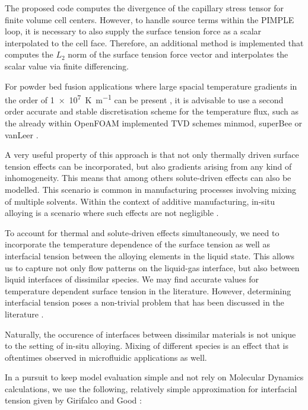 \documentclass[conference,final]{IEEEtran}
\begin{document}
The proposed code computes the divergence of the capillary stress tensor for finite volume cell centers. However, to handle source terms within the PIMPLE loop, it is necessary to also supply the surface tension force as a scalar interpolated to the cell face. Therefore, an additional method is implemented that computes the $L_2$ norm of the surface tension force vector and interpolates the scalar value via finite differencing.

For powder bed fusion applications where large spacial temperature gradients in the order of \SI[per-mode=fraction]{1e7}{\kelvin \per \metre} can be present \cite{hooperMeltPoolTemperature2018}, it is advisable to use a second order accurate and stable discretisation scheme for the temperature flux, such as the already within OpenFOAM implemented TVD schemes minmod, superBee or vanLeer \cite{roeCharacteristicBasedSchemesEuler1986,vanleerUltimateConservativeDifference1974}.

A very useful property of this approach is that not only thermally driven surface tension effects can be incorporated, but also gradients arising from any kind of inhomogeneity. This means that among others solute-driven effects can also be modelled. This scenario is common in manufacturing processes involving mixing of multiple solvents. Within the context of additive manufacturing, in-situ alloying is a scenario where such effects are not negligible \cite{katz-demyanetzInsituAlloyingNovel2020}.

To account for thermal and solute-driven effects simultaneously, we need to incorporate the temperature dependence of the surface tension as well as interfacial tension between the alloying elements in the liquid state. This allows us to capture not only flow patterns on the liquid-gas interface, but also between liquid interfaces of dissimilar species. We may find accurate values for temperature dependent surface tension in the literature. However, determining interfacial tension poses a non-trivial problem that has been discussed in the literature \cite{marmurCorrelatingInterfacialTensions2010}.

Naturally, the occurence of interfaces between dissimilar materials is not unique to the setting of in-situ alloying. Mixing of different species is an effect that is oftentimes observed in microfluidic applications as well.

In a pursuit to keep model evaluation simple and not rely on Molecular Dynamics calculations, we use the following, relatively simple approximation for interfacial tension given by Girifalco and Good \cite{girifalcoTheoryEstimationSurface1957}:
\end{document}
